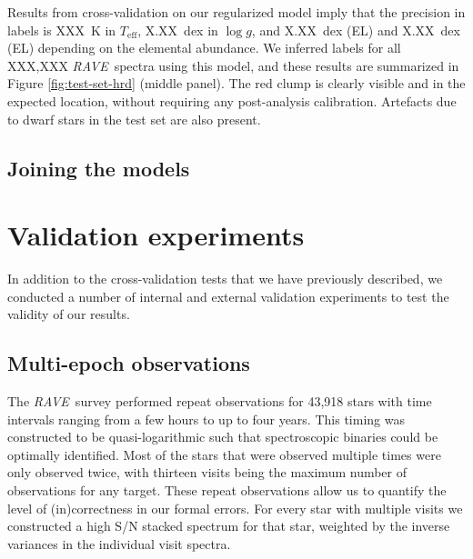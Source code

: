 \documentclass[preprint,trackchanges]{aastex}
\newcommand{\acronym}[1]{{\small{#1}}}
\newcommand{\project}[1]{\textsl{#1}}
\newcommand{\rave}{\project{\acronym{RAVE}}}
\newcommand{\teff}{T_{\mathrm{eff}}}
\newcommand{\logg}{\log g}
\begin{document}
Results from cross-validation on our regularized model imply that the precision
in labels is XXX~K in $\teff$, X.XX~dex in $\logg$, and X.XX~dex (EL) and 
X.XX~dex (EL) depending on the elemental abundance.  We inferred labels for all
XXX,XXX \rave\ spectra using this model, and these results are summarized in
Figure \ref{fig:test-set-hrd} (middle panel).  The red clump is clearly visible
and in the expected location, without requiring any post-analysis calibration.
Artefacts due to dwarf stars in the test set are also present.


\subsection{Joining the models}
\label{sec:joining-the-models}




\section{Validation experiments}
\label{sec:validation}

In addition to the cross-validation tests that we have previously described, 
we conducted a number of internal and external validation experiments to 
test the validity of our results.

\subsection{Multi-epoch observations}
\label{sec:repeat-observations}

The \rave\ survey performed repeat observations for 43,918 stars with time 
intervals ranging from a few hours to up to four years.  This timing was 
constructed to be quasi-logarithmic such that spectroscopic binaries could
be optimally identified. Most of the stars that were observed multiple times
were only observed twice, with thirteen visits being the maximum number 
of observations for any target.  These repeat observations allow us to 
quantify the level of (in)correctness in our formal errors.  For every star
with multiple visits we constructed a high S/N stacked spectrum for that
star, weighted by the inverse variances in the individual visit spectra.
\end{document}
